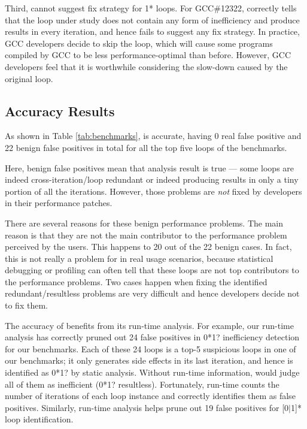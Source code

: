 Third, \Tool cannot suggest fix strategy for 1* loops.
For GCC\#12322, \Tool correctly tells that the loop under study
does not contain any form of inefficiency and produce results in every 
iteration, and hence fails to suggest any fix strategy. In practice, GCC
developers decide to skip the loop, which will cause some programs compiled by
GCC
to be less performance-optimal than before. However, GCC developers feel
that it is worthwhile considering the slow-down caused by the original loop.

\subsection{Accuracy Results}
\label{sec:result_acc}

%

As shown in Table \ref{tab:benchmarks}, \Tool is accurate, having 0 real
false positive and 22 benign false positives in total for all the top five loops
of the \allbugs benchmarks.

Here, benign false positives mean that \Tool analysis result is true ---
some loops are indeed cross-iteration/loop redundant or indeed producing
results in only a tiny portion of all the iterations. However, those
problems are \textit{not} fixed by developers in their performance patches. 

There are several reasons for these benign performance problems. 
The main reason is that they are not the main contributor to the 
performance problem perceived by the users. This happens to 20 out of the
22 benign cases. %
In fact, this is not really a problem for \Tool in 
real usage scenarios, because statistical debugging or profiling can often
tell that these loops are not top contributors to the performance
problems.
Two cases happen when fixing the 
identified redundant/resultless problems
are very difficult and hence developers decide not to fix them.

The accuracy of \Tool benefits from its run-time analysis.
For example, our run-time analysis has correctly pruned out 24 false positives
in 0*1? inefficiency detection for our benchmarks. Each of these 24 loops is a
top-5 suspicious loops in one of our benchmarks; it only generates side effects
in its last iteration, and hence is identified as 0*1? by static analysis. 
Without run-time information, \Tool would judge
all of them as inefficient (0*1? resultless). Fortunately,
\Tool run-time counts the number of iterations of each loop instance and
correctly identifies them as false positives. Similarly, \Tool run-time analysis
helps prune out 19 false positives for [0$|$1]* loop identification.

